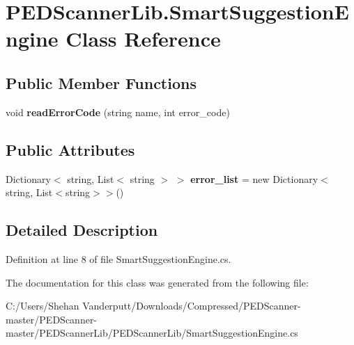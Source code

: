 \hypertarget{class_p_e_d_scanner_lib_1_1_smart_suggestion_engine}{}\section{P\+E\+D\+Scanner\+Lib.\+Smart\+Suggestion\+Engine Class Reference}
\label{class_p_e_d_scanner_lib_1_1_smart_suggestion_engine}
\subsection*{Public Member Functions}
\begin{DoxyCompactItemize}
\item 
\mbox{\label{class_p_e_d_scanner_lib_1_1_smart_suggestion_engine_a1496a35e67a3e90137658dfc4ac42bd5}} 
void {\bfseries read\+Error\+Code} (string name, int error\+\_\+code)
\end{DoxyCompactItemize}
\subsection*{Public Attributes}
\begin{DoxyCompactItemize}
\item 
\mbox{\label{class_p_e_d_scanner_lib_1_1_smart_suggestion_engine_ab57b34b7c0fe4a09b74ff75c2e1273ec}} 
Dictionary$<$ string, List$<$ string $>$ $>$ {\bfseries error\+\_\+list} = new Dictionary$<$string, List$<$string$>$$>$()
\end{DoxyCompactItemize}


\subsection{Detailed Description}


Definition at line 8 of file Smart\+Suggestion\+Engine.\+cs.



The documentation for this class was generated from the following file\+:\begin{DoxyCompactItemize}
\item 
C\+:/\+Users/\+Shehan Vanderputt/\+Downloads/\+Compressed/\+P\+E\+D\+Scanner-\/master/\+P\+E\+D\+Scanner-\/master/\+P\+E\+D\+Scanner\+Lib/\+P\+E\+D\+Scanner\+Lib/Smart\+Suggestion\+Engine.\+cs\end{DoxyCompactItemize}
